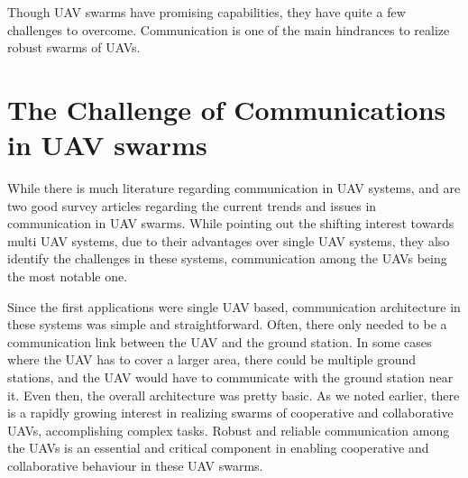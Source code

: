 Though UAV swarms have promising capabilities, they have quite a few challenges to overcome. Communication is one of the main hindrances to realize robust swarms of UAVs.

\section{The Challenge of Communications in UAV swarms}
While there is much literature regarding communication in UAV systems, \cite{fanets} and \cite{lavgupta} are two good survey articles regarding the current trends and issues in communication in UAV swarms. While pointing out the shifting interest towards multi UAV systems, due to their advantages over single UAV systems, they also identify the challenges in these systems, communication among the UAVs being the most notable one. 

Since the first applications were single UAV based, communication architecture in these systems was simple and straightforward. Often, there only needed to be a communication link between the UAV and the ground station. In some cases where the UAV has to cover a larger area, there could be multiple ground stations, and the UAV would have to communicate with the ground station near it. Even then, the overall architecture was pretty basic. As we noted earlier, there is a rapidly growing interest in realizing swarms of cooperative and collaborative UAVs, accomplishing complex tasks. Robust and reliable communication among the UAVs is an essential and critical component in enabling cooperative and collaborative behaviour in these UAV swarms.
